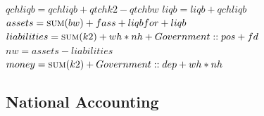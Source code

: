 \documentclass{article}
\begin{document}
\begin{algorithm}[!htbp]
\caption{Bank Update}
    \begin{algorithmic}
        \State \(qchliqb = qchliqb + qtchk2 - qtchbw\)
        \State \(liqb = liqb + qchliqb\)
        \\
        \State \(assets = \Call{sum}{bw} + fass + liqbfor + liqb\)
    \State \(liabilities = \Call{sum}{k2} + wh * nh + Government::pos + fd\)
        \State \(nw = assets - liabilities\)
        \\
        \State \(money = \Call{sum}{k2} + Government::dep + wh * nh\)
        \EndFunction
    \end{algorithmic}
\end{algorithm}

\subsection{National Accounting}
\end{document}

